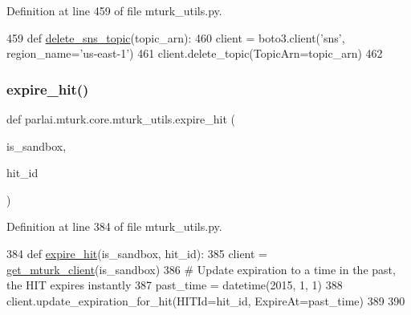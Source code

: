 Definition at line 459 of file mturk\+\_\+utils.\+py.


\begin{DoxyCode}
459 \textcolor{keyword}{def }\hyperlink{namespaceparlai_1_1mturk_1_1core_1_1mturk__utils_a669fa20824749469221df338aa8a0e8e}{delete\_sns\_topic}(topic\_arn):
460     client = boto3.client(\textcolor{stringliteral}{'sns'}, region\_name=\textcolor{stringliteral}{'us-east-1'})
461     client.delete\_topic(TopicArn=topic\_arn)
462 \end{DoxyCode}
\mbox{\label{namespaceparlai_1_1mturk_1_1core_1_1mturk__utils_a960c8639f5fa43ab8be109eb48ea1925}} 
\subsubsection{\texorpdfstring{expire\+\_\+hit()}{expire\_hit()}}
{\footnotesize\ttfamily def parlai.\+mturk.\+core.\+mturk\+\_\+utils.\+expire\+\_\+hit (\begin{DoxyParamCaption}\item[{}]{is\+\_\+sandbox,  }\item[{}]{hit\+\_\+id }\end{DoxyParamCaption})}



Definition at line 384 of file mturk\+\_\+utils.\+py.


\begin{DoxyCode}
384 \textcolor{keyword}{def }\hyperlink{namespaceparlai_1_1mturk_1_1core_1_1mturk__utils_a960c8639f5fa43ab8be109eb48ea1925}{expire\_hit}(is\_sandbox, hit\_id):
385     client = \hyperlink{namespaceparlai_1_1mturk_1_1core_1_1mturk__utils_a577e2527c04682284394b0951a090695}{get\_mturk\_client}(is\_sandbox)
386     \textcolor{comment}{# Update expiration to a time in the past, the HIT expires instantly}
387     past\_time = datetime(2015, 1, 1)
388     client.update\_expiration\_for\_hit(HITId=hit\_id, ExpireAt=past\_time)
389 
390 
\end{DoxyCode}
\mbox{\label{namespaceparlai_1_1mturk_1_1core_1_1mturk__utils_ae5d70edec5817ee9e05b9675320859d7}} 
